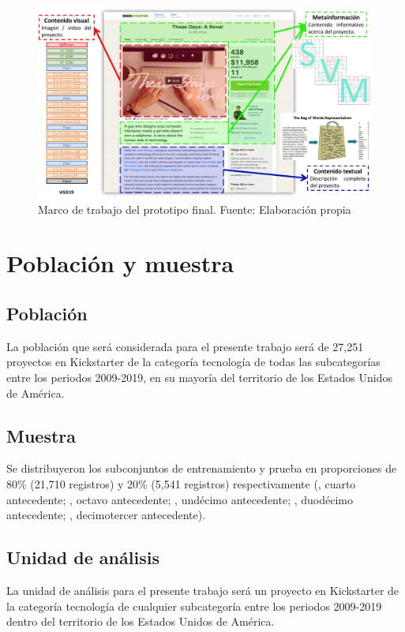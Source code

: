 \begin{figure}[htbp]
	\begin{center}
		\includegraphics[width=1\textwidth]{3/figures/prototipo.jpg}
		\caption{Marco de trabajo del prototipo final. Fuente: Elaboración propia}
		\label{3:fig1}
	\end{center}
\end{figure}

\section{Población y muestra}

\subsection{Población}
La población que será considerada para el presente trabajo será de 27,251 proyectos en Kickstarter de la categoría tecnología de todas las subcategorías entre los periodos 2009-2019, en su mayoría del territorio de los Estados Unidos de América.

\subsection{Muestra}
Se distribuyeron los subconjuntos de entrenamiento y prueba en proporciones de 80\% (21,710 registros) y 20\% (5,541 registros) respectivamente (\citeauthor{pr_yuan2016textanalytics}, cuarto antecedente; \citeauthor{pr_yu2018deeplearning}, octavo antecedente; \citeauthor{pr_chen2019keywords_crowdfunding}, undécimo antecedente; \citeauthor{pr_mitra2014phrases}, duodécimo antecedente; \citeauthor{pr_sawhney2016usingLT}, decimotercer antecedente).

\subsection{Unidad de análisis}
La unidad de análisis para el presente trabajo será un proyecto en Kickstarter de la categoría tecnología de cualquier subcategoría entre los periodos 2009-2019 dentro del territorio de los Estados Unidos de América.

